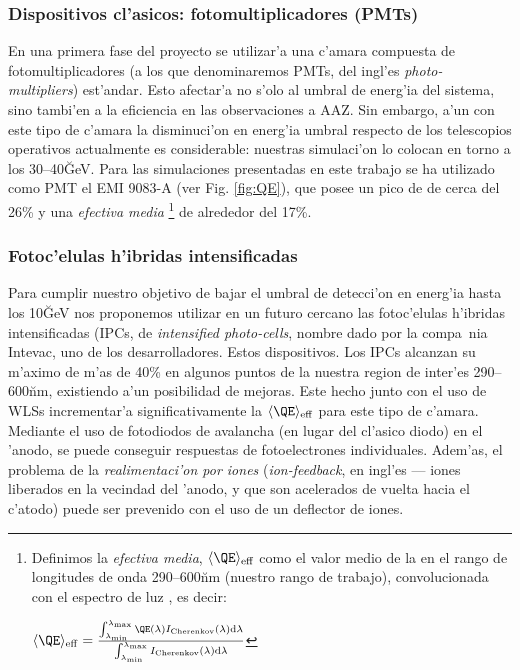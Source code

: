 \subsubsection{Dispositivos cl'asicos: fotomultiplicadores (PMTs)}
%
En una primera fase del proyecto se utilizar'a una c'amara compuesta
de fotomultiplicadores (a los que denominaremos PMTs, del ingl'es
\emph{photo-multipliers}) est'andar. Esto afectar'a no s'olo al umbral
de energ'ia del sistema, sino tambi'en a la eficiencia en las
observaciones a AAZ. Sin embargo, a'un con este tipo de c'amara la
disminuci'on en energ'ia umbral respecto de los telescopios operativos
actualmente es considerable: nuestras simulaci'on lo colocan en torno
a los 30--40\u{GeV}. Para las simulaciones presentadas en este trabajo
se ha utilizado como PMT el EMI 9083-A (ver Fig. \ref{fig:QE}), que
posee un pico de \QE de cerca del 26\% y una \emph{\QE efectiva
media}%
\footnote{Definimos la \emph{\QE efectiva media}, 
$\langle\QE\rangle_\mathrm{eff}$ como el valor medio de la \QE en el
rango de longitudes de onda 290--600\u{nm} (nuestro rango de trabajo),
convolucionada con el espectro de luz \Cherenkov, es decir:\\
\centerline{$ \langle\QE\rangle_\mathrm{eff} = 
\frac{\int_{\lambda_\mathrm{min}}^{\lambda_\mathrm{max}} \QE(\lambda)
I_\mathrm{Cherenkov} (\lambda) \mathrm{d}\lambda }%
{\int_{\lambda_\mathrm{min}}^{\lambda_\mathrm{max}}
I_\mathrm{Cherenkov} (\lambda) \mathrm{d}\lambda} $} } de alrededor del
17\%. %

\subsubsection{Fotoc'elulas h'ibridas intensificadas}
%
Para cumplir nuestro objetivo de bajar el umbral de detecci'on en
energ'ia hasta los 10\u{GeV} nos proponemos utilizar en un futuro
cercano las fotoc'elulas h'ibridas intensificadas (IPCs, de
\emph{intensified photo-cells}, nombre dado por la compa~nia Intevac,
uno de los desarrolladores. Estos dispositivos. Los IPCs alcanzan su
m'aximo de m'as de 40\% \QE en algunos puntos de la nuestra region de
inter'es 290--600\u{nm}, existiendo a'un posibilidad de mejoras. Este
hecho junto con el uso de WLSs incrementar'a significativamente la
$\langle\QE\rangle_\mathrm{eff}$ para este tipo de c'amara.  Mediante
el uso de fotodiodos de avalancha (en lugar del cl'asico diodo) en el
'anodo, se puede conseguir respuestas de fotoelectrones
individuales. Adem'as, el problema de la \emph{realimentaci'on por
iones} (\emph{ion-feedback}, en ingl'es --- iones liberados en la
vecindad del 'anodo, y que son acelerados de vuelta hacia el c'atodo)
puede ser prevenido con el uso de un deflector de iones.

